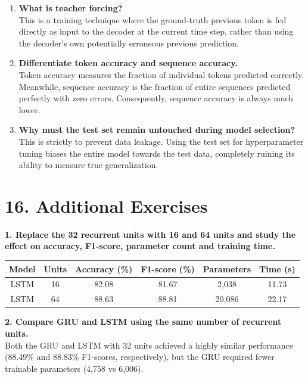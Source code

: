 \documentclass[10pt]{article}
\begin{document}
\begin{enumerate}[itemsep=0.15cm]
    \item {\small \textbf{What is teacher forcing?}} \\[0.1cm]
This is a training technique where the ground-truth previous token is fed directly as input to the decoder at the current time step, rather than using the decoder's own potentially erroneous previous prediction.
    \item {\small \textbf{Differentiate token accuracy and sequence accuracy.}} \\[0.1cm]
Token accuracy measures the fraction of individual tokens predicted correctly. Meanwhile, sequence accuracy is the fraction of entire sequences predicted perfectly with zero errors. Consequently, sequence accuracy is always much lower.
    \item {\small \textbf{Why must the test set remain untouched during model selection?}} \\[0.1cm]
This is strictly to prevent data leakage. Using the test set for hyperparameter tuning biases the entire model towards the test data, completely ruining its ability to measure true generalization.
\end{enumerate}

\section*{16. Additional Exercises}
\textbf{1. Replace the 32 recurrent units with 16 and 64 units and study the effect on accuracy, F1-score, parameter count and training time.}
\begin{table}[H]
    \centering
    \begin{tabular}{|c|c|c|c|c|c|}
        \hline
        \textbf{Model} & \textbf{Units} & \textbf{Accuracy (\%)} & \textbf{F1-score (\%)} & \textbf{Parameters} & \textbf{Time (s)} \\ \hline
        LSTM & 16 & 82.08 & 81.67 & 2,038 & 11.73 \\ \hline
        LSTM & 64 & 88.63 & 88.81 & 20,086 & 22.17 \\ \hline
    \end{tabular}
\end{table}

\vspace{0.15cm}
\textbf{2. Compare GRU and LSTM using the same number of recurrent units.} \\
Both the GRU and LSTM with 32 units achieved a highly similar performance (88.49\% and 88.83\% F1-scores, respectively), but the GRU required fewer trainable parameters (4,758 vs 6,006).
\end{document}
